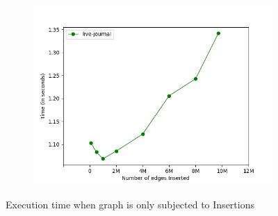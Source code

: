 \documentclass[a4paper]{article}
\begin{document}
\begin{figure}[H]
\begin{subfigure}[b]{0.32\textwidth}
         \includegraphics[width=\textwidth]{img/ins/i2.png}
         \caption{}
         \label{fig:insert_trend_3}
    \end{subfigure}
    \caption{Execution time when graph is only subjected to Insertions }
    \label{fig:insert_trend}
\end{figure}
\end{document}
